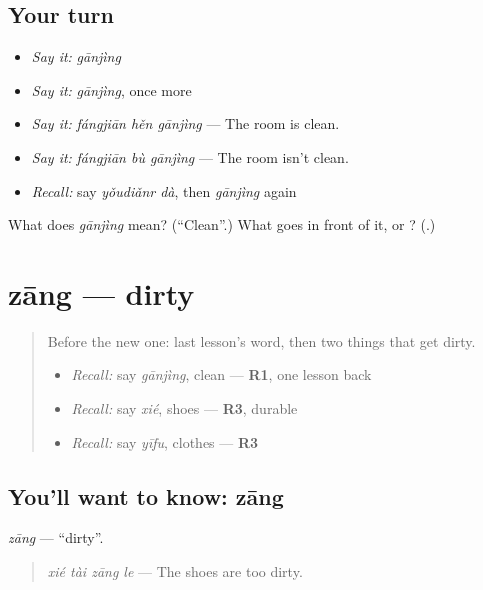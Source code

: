 \subsection*{Your turn}
\begin{itemize}
\raggedright
  \item \emph{Say it:} \emph{gānjìng}
  \item \emph{Say it:} \emph{gānjìng}, once more
  \item \emph{Say it:} \emph{fángjiān hěn gānjìng} — The room is clean.
  \item \emph{Say it:} \emph{fángjiān bù gānjìng} — The room isn't clean.
  \item \emph{Recall:} say \emph{yǒudiǎnr dà}, then \emph{gānjìng} again
\end{itemize}

\begin{tcolorbox}[breakable,colback=teal!4,colframe=teal!35!black,title={Before you move on}]
What does \emph{gānjìng} mean? (\textquotedblleft{}Clean\textquotedblright{}.) What goes in front of it,  or ? (\textbf{}.)
\end{tcolorbox}
\section[zāng]{zāng — dirty}

\label{lesson:ZH-C93-zang}



\begin{quote}
Before the new one: last lesson's word, then two things that get dirty.

\begin{itemize}
\raggedright
  \item \emph{Recall:} say \emph{gānjìng}, clean — \textbf{R1}, one lesson back
  \item \emph{Recall:} say \emph{xié}, shoes — \textbf{R3}, durable
  \item \emph{Recall:} say \emph{yīfu}, clothes — \textbf{R3}
\end{itemize}
\end{quote}

\subsection*{You'll want to know: zāng}
\emph{zāng} — \textquotedblleft{}dirty\textquotedblright{}.

\begin{quote}
\emph{xié tài zāng le} — The shoes are too dirty.
\end{quote}

